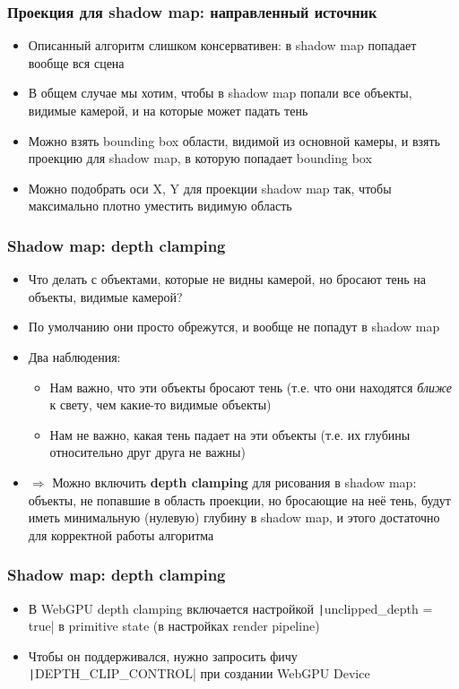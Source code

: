 \documentclass[10pt]{beamer}
\begin{document}
\begin{frame}[fragile]
\frametitle{Проекция для shadow map: направленный источник}
\begin{itemize}
\item Описанный алгоритм слишком консервативен: в shadow map попадает вообще вся сцена
\pause
\item В общем случае мы хотим, чтобы в shadow map попали все объекты, видимые камерой, и на которые может падать тень
\pause
\item Можно взять bounding box области, видимой из основной камеры, и взять проекцию для shadow map, в которую попадает bounding box
\pause
\item Можно подобрать оси X, Y для проекции shadow map так, чтобы максимально плотно уместить видимую область
\end{itemize}
\end{frame}

\begin{frame}[fragile]
\frametitle{Shadow map: depth clamping}
\begin{itemize}
\item Что делать с объектами, которые не видны камерой, но бросают тень на объекты, видимые камерой?
\pause
\item По умолчанию они просто обрежутся, и вообще не попадут в shadow map
\pause
\item Два наблюдения:
\pause
\begin{itemize}
\item Нам важно, что эти объекты бросают тень (т.е. что они находятся \textit{ближе} к свету, чем какие-то видимые объекты)
\pause
\item Нам не важно, какая тень падает на эти объекты (т.е. их глубины относительно друг друга не важны)
\end{itemize}
\pause
\item \(\Longrightarrow\) Можно включить \textbf{depth clamping} для рисования в shadow map: объекты, не попавшие в область проекции, но бросающие на неё тень, будут иметь минимальную (нулевую) глубину в shadow map, и этого достаточно для корректной работы алгоритма
\end{itemize}
\end{frame}

\begin{frame}[fragile]
\frametitle{Shadow map: depth clamping}
\begin{itemize}
\item В WebGPU depth clamping включается настройкой \texttt|unclipped_depth = true| в primitive state (в настройках render pipeline)
\pause
\item Чтобы он поддерживался, нужно запросить фичу \texttt|DEPTH_CLIP_CONTROL| при создании WebGPU Device
\end{itemize}
\end{frame}
\end{document}
